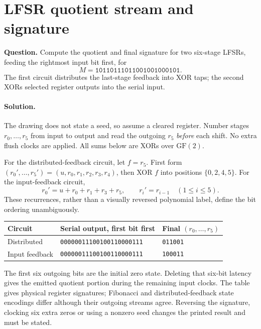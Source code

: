 \documentclass[11pt]{article}
\newcommand{\sol}{\paragraph{Solution.}}
\begin{document}
\section{LFSR quotient stream and signature}
\textbf{Question.} Compute the quotient and final signature for two six-stage
LFSRs, feeding the rightmost input bit first, for
\[
M=\texttt{10110111011001001000101}.
\]
The first circuit distributes the last-stage feedback into XOR taps;
the second XORs selected register outputs into the serial input.
\begin{center}\end{center}

\sol The drawing does not state a seed, so assume a cleared register.
Number stages $r_0,\ldots,r_5$ from input to output and read the outgoing
$r_5$ \emph{before} each shift. No extra flush clocks are applied.
All sums below are XORs over $\mathrm{GF}(2)$.

For the distributed-feedback circuit, let $f=r_5$.
First form $(r_0',\ldots,r_5')=(u,r_0,r_1,r_2,r_3,r_4)$,
then XOR $f$ into positions $\{0,2,4,5\}$.
For the input-feedback circuit,
\[
r_0'=u+r_0+r_1+r_3+r_5,\qquad r_i'=r_{i-1}\quad(1\le i\le5).
\]
These recurrences, rather than a visually reversed polynomial label, define
the bit ordering unambiguously.
\begin{center}\begin{tabular}{lll}\toprule
Circuit & Serial output, first bit first & Final $(r_0,\ldots,r_5)$\\\midrule
Distributed & \texttt{00000011100100110000111} & \texttt{011001}\\
Input feedback & \texttt{00000011100100110000111} & \texttt{100011}\\
\bottomrule\end{tabular}\end{center}
The first six outgoing bits are the initial zero state.
Deleting that six-bit latency gives the emitted quotient portion during the
remaining input clocks. The table gives physical register signatures;
Fibonacci and distributed-feedback state encodings differ although their
outgoing streams agree. Reversing the signature, clocking six extra zeros or
using a nonzero seed changes the printed result and must be stated.
\end{document}
